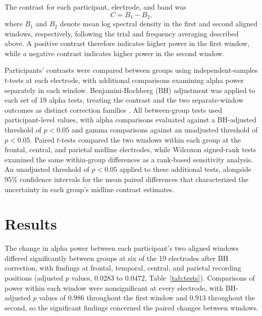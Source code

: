 \documentclass[11pt,letterpaper]{article}
\begin{document}
The contrast for each participant, electrode, and band was
\begin{equation}
C = B_1 - B_2,
\label{eq:contrast}
\end{equation}
where \(B_1\) and \(B_2\) denote mean log spectral density in the first and second aligned windows, respectively, following the trial and frequency averaging described above. A positive contrast therefore indicates higher power in the first window, while a negative contrast indicates higher power in the second window.

Participants' contrasts were compared between groups using independent-samples \(t\)-tests at each electrode, with additional comparisons examining alpha power separately in each window. Benjamini-Hochberg (BH) adjustment was applied to each set of 19 alpha tests, treating the contrast and the two separate-window outcomes as distinct correction families \cite{bh}. All between-group tests used participant-level values, with alpha comparisons evaluated against a BH-adjusted threshold of \(p<0.05\) and gamma comparisons against an unadjusted threshold of \(p<0.05\). Paired \(t\)-tests compared the two windows within each group at the frontal, central, and parietal midline electrodes, while Wilcoxon signed-rank tests examined the same within-group differences as a rank-based sensitivity analysis. An unadjusted threshold of \(p<0.05\) applied to these additional tests, alongside 95\% confidence intervals for the mean paired differences that characterized the uncertainty in each group's midline contrast estimates.

\section{Results}
The change in alpha power between each participant's two aligned windows differed significantly between groups at six of the 19 electrodes after BH correction, with findings at frontal, temporal, central, and parietal recording positions (adjusted \(p\) values, \(0.0283\) to \(0.0472\), Table~\ref{tab:tests}). Comparisons of power within each window were nonsignificant at every electrode, with BH-adjusted \(p\) values of \(0.986\) throughout the first window and \(0.913\) throughout the second, so the significant findings concerned the paired changes between windows.
\end{document}
